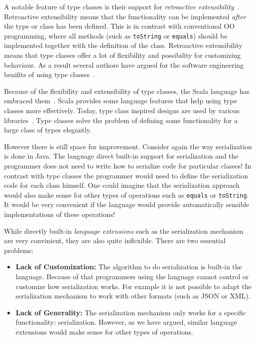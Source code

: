 \documentclass[preprint]{sigplanconf}
\begin{document}
A notable feature of type classes is their support for
\emph{retroactive extensibility}~\cite{}.  Retroactive extensibility means
that the functionality can be implemented \emph{after} the type or
class has been defined. This is in contrast with conventional OO
programming, where all methods (such as \lstinline{toString} or
\lstinline{equals}) should be implemented together with the
definition of the class. Retroactive extensibility means that type
classes offer a lot of flexibility and possibility for customizing
behaviour. As a result several authors have argued for the software
engineering benifits of using type classes~\cite{}.

Because of the flexibility and extensibility of type classes, the
Scala language has embraced them~\cite{}. Scala provides some language
features that help using type classes more effectively. Today, type
class inspired designs are used by various libraries~\cite{}.  Type
classes solve the problem of defining some functionality for a large
class of types elegantly.

However there is still space for improvement. Consider again the way
serialization is done in Java. The language direct built-in support
for serialization and the programmer does not need to write how to serialize code
for particular classes!  In contrast with type classes the programmer
would need to define the serialization code for each class himself.
One could imagine that the serialization approach would also make
sense for other types of operations such as \lstinline{equals} or
\lstinline{toString}.  It would be very convenient if the language would
provide automatically sensible implementations of these operations!

While directly built-in \emph{language extensions} such as the
serialization mechanism are very convinient, they are also quite
inflexible. There are two essential problems:

\begin{itemize}
\item {\bf Lack of Customization:} The algorithm to do serialization
  is built-in the language. Because of that programmers using the
  language cannot control or customize how serialization works. For
  example it is not possible to adapt the serialization mechanism to
  work with other formats (such as JSON or XML).

\item {\bf Lack of Generality:} The serialization mechanism only
  works for a specific functionality: serialization. However, as we
  have argued, similar language extensions would make sense for other types
  of operations.
\end{itemize}
\end{document}
